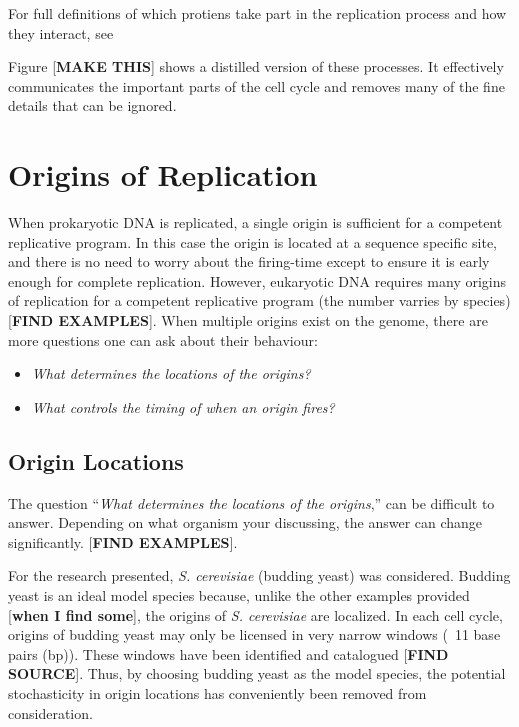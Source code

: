 \documentclass[serif]{sfuthesis}
\begin{document}
		For full definitions of which protiens take part in the replication process and how they interact, see \cite{PurifiedProteins}
		
	Figure [\textbf{MAKE THIS}] shows a distilled version of these processes. It effectively communicates the important parts of the cell cycle and removes many of the fine details that can be ignored.
	
	
	\section{Origins of Replication}
	
	When prokaryotic DNA is replicated, a single origin is sufficient for a competent replicative program.
	In this case the origin is located at a sequence specific site, and there is no need to worry about the firing-time except to ensure it is early enough for complete replication.
	However, eukaryotic DNA requires many origins of replication for a competent replicative program (the number varries by species) [\textbf{FIND EXAMPLES}].
	When multiple origins exist on the genome, there are more questions one can ask about their behaviour:
	\begin{itemize}
		\item \emph{What determines the locations of the origins?}
		\item \emph{What controls the timing of when an origin fires?}
	\end{itemize}
	
		\subsection{Origin Locations}
		
		The question ``\emph{What determines the locations of the origins},'' can be difficult to answer.
		Depending on what organism your discussing, the answer can change significantly.
		[\textbf{FIND EXAMPLES}].
		
		For the research presented, \emph{S. cerevisiae} (budding yeast) was considered.
		Budding yeast is an ideal model species because, unlike the other examples provided [\textbf{when I find some}], the origins of \emph{S. cerevisiae} are localized.
		In each cell cycle, origins of budding yeast may only be licensed in very narrow windows (~11 base pairs (bp)).
		These windows have been identified and catalogued [\textbf{FIND SOURCE}].
		Thus, by choosing budding yeast as the model species, the potential stochasticity in origin locations has conveniently been removed from consideration.
		
\end{document}
